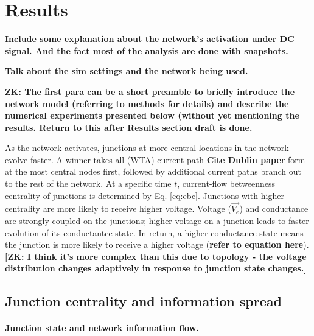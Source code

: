 \documentclass[fleqn,10pt,  amsmath,amssymb,aps]{wlscirep}
\begin{document}
\clearpage
\section*{Results}

\textbf{Include some explanation about the network's activation under DC signal. And the fact most of the analysis are done with snapshots.}

\textbf{Talk about the sim settings and the network being used.}

\textbf{ZK: The first para can be a short preamble to briefly introduce the network model (referring to methods for details) and describe the numerical experiments presented below (without yet mentioning the results. Return to this after Results section draft is done.}


As the network activates, junctions at more central locations in the network evolve faster. A winner-takes-all (WTA) current path \textbf{Cite Dublin paper} form at the most central nodes first, followed by additional current paths branch out to the rest of the network. At a specific time $t$, current-flow betweenness centrality of junctions is determined by Eq. \ref{eq:ebc}. Junctions with higher centrality are more likely to receive higher voltage. Voltage ($\vec{V_e}$) and conductance are strongly coupled on the junctions; higher voltage on a junction leads to faster evolution of its conductantce state.
In return, a higher conductance state means the junction is more likely to receive a higher voltage (\textbf{refer to equation here}).\textbf{[ZK: I think it's more complex than this due to topology - the voltage distribution changes adaptively in response to junction state changes.]}


\subsection*{Junction centrality and information spread}

\paragraph{Junction state and network information flow.}
\end{document}
